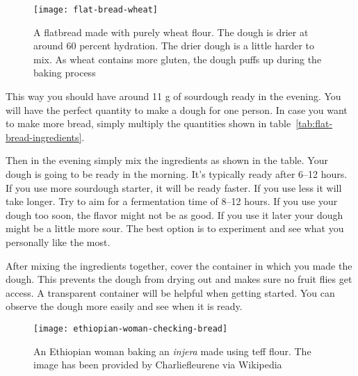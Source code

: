 \begin{figure}[htb!]
  \texttt{[image: flat-bread-wheat]}
  \centering
  \caption{A flatbread made with purely wheat flour. The dough is drier
  at around 60 percent hydration. The drier dough is a little harder
  to mix. As wheat contains more gluten, the dough puffs up during
  the baking process}
\end{figure}

This way you should have around 11 g of sourdough ready in the evening. You will have
the perfect quantity to make a dough for one person. In case you want to make more
bread, simply multiply the quantities shown in table~\ref*{tab:flat-bread-ingredients}.

Then in the evening simply mix the ingredients as shown in the table. Your dough
is going to be ready in the morning. It's typically ready after 6--12 hours. If
you use more sourdough starter, it will be ready faster. If you use less it will take
longer. Try to aim for a fermentation time of 8--12 hours. If you use
your dough too soon, the flavor might not be as good. If you use it later
your dough might be a little more sour. The best option is to experiment
and see what you personally like the most.

After mixing the ingredients together, cover the container in which
you made the dough. This prevents the dough from drying out and makes
sure no fruit flies get access. A transparent container will be helpful
when getting started. You can observe the dough more easily and see when
it is ready.

\begin{figure}[htb!]
  \texttt{[image: ethiopian-woman-checking-bread]}
  \centering
  \caption{An Ethiopian woman baking an \emph{injera} made using teff flour.
  The image has been provided by Charliefleurene via Wikipedia}
\end{figure}


